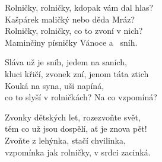 
\cho{}
Rolničky, rolničky, kdopak vám dal hlas?\\
Kašpárek maličký nebo děda Mráz?\\
Rolničky, rolničky, co to zvoní v nich?\\
Maminčiny písničky Vánoce a \ sníh.

\ve{}
Sláva už je sníh, jedem na saních,\\
kluci křičí, zvonek zní, jenom táta ztich\\
Kouká na syna, uši napíná,\\
co to slyší v rolničkách? Na co vzpomíná?

\cho{}

\ve{}
Zvonky dětských let, rozezvoňte svět,\\
těm co už jsou dospělí, ať je znova pět!\\
Zvoňte z lehýnka, stačí chvilinka,\\
vzpomínka jak rolničky, v srdci zacinká.

\cho{}

\esong{}
